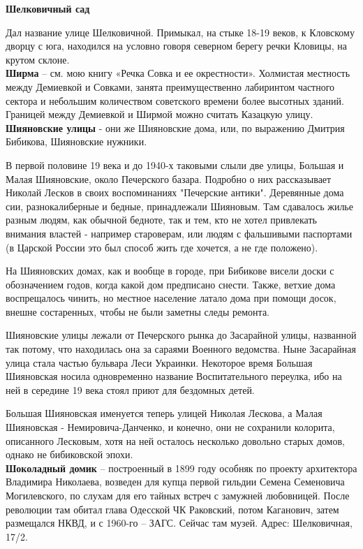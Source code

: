 \textbf{Шелковичный сад}

Дал название улице Шелковичной. Примыкал, на стыке 18-19 веков, к Кловскому дворцу с юга, находился на условно говоря северном берегу речки Кловицы, на крутом склоне.\\

\textbf{Ширма} – см. мою книгу «Речка Совка и ее окрестности». Холмистая местность между Демиевкой и Совками, занята преимущественно лабиринтом частного сектора и небольшим количеством советского времени более высотных зданий. Границей между Демиевкой и Ширмой можно считать Казацкую улицу.\\

\textbf{Шияновские улицы} - они же Шияновские дома, или, по выражению Дмитрия Бибикова, Шияновские нужники.

В первой половине 19 века и до 1940-х таковыми слыли две улицы, Большая и Малая Шияновские, около Печерского базара. Подробно о них рассказывает Николай Лесков в своих воспоминаниях "Печерские антики". Деревянные дома сии, разнокалиберные и бедные, принадлежали Шияновым. Там сдавалось жилье разным людям, как обычной бедноте, так и тем, кто не хотел привлекать внимания властей - например староверам, или людям с фальшивыми паспортами (в Царской России это был способ жить где хочется, а не где положено).

На Шияновских домах, как и вообще в городе, при Бибикове висели доски с обозначением годов, когда какой дом предписано снести. Также, ветхие дома воспрещалось чинить, но местное население латало дома при помощи досок, внешне состаренных, чтобы не были заметны следы ремонта.

Шияновские улицы лежали от Печерского рынка до Засарайной улицы, названной так потому, что находилась она за сараями Военного ведомства. Ныне Засарайная улица стала частью бульвара Леси Украинки. Некоторое время Большая Шияновская носила одновременно название Воспитательного переулка, ибо на ней в середине 19 века стоял приют для бездомных детей.

Большая Шияновская именуется теперь улицей Николая Лескова, а Малая Шияновская - Немировича-Данченко, и конечно, они не сохранили колорита, описанного Лесковым, хотя на ней осталось несколько довольно старых домов, однако не бибиковской эпохи.\\

\textbf{Шоколадный домик} – построенный в 1899 году особняк по проекту архитектора Владимира Николаева, возведен для купца первой гильдии Семена Семеновича Могилевского, по слухам для его тайных встреч с замужней любовницей. После революции там обитал глава Одесской ЧК Раковский, потом Каганович, затем размещался НКВД, и с 1960-го – ЗАГС. Сейчас там музей. Адрес: Шелковичная, 17/2.\\

